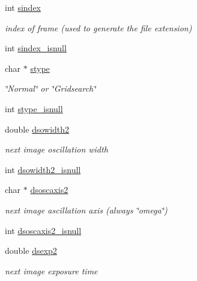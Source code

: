 \begin{DoxyCompactItemize}
\item 
int \hyperlink{structlspg__nextshot__struct_a5d096f2c2bf9be29c44129b54eaf01da}{sindex}
\begin{DoxyCompactList}\small\item\em index of frame (used to generate the file extension) \item\end{DoxyCompactList}\item 
int \hyperlink{structlspg__nextshot__struct_a7ca4fbc86974d1b75a681ba5ecaaf5af}{sindex\_\-isnull}
\item 
char $\ast$ \hyperlink{structlspg__nextshot__struct_ab5a70b189c2fe516ca0c84bd06f3e564}{stype}
\begin{DoxyCompactList}\small\item\em \char`\"{}Normal\char`\"{} or \char`\"{}Gridsearch\char`\"{} \item\end{DoxyCompactList}\item 
int \hyperlink{structlspg__nextshot__struct_a79f48c452a4aca8506bae22f897c7441}{stype\_\-isnull}
\item 
double \hyperlink{structlspg__nextshot__struct_a5378e13735a5392a9fcd853ce8c9e929}{dsowidth2}
\begin{DoxyCompactList}\small\item\em next image oscillation width \item\end{DoxyCompactList}\item 
int \hyperlink{structlspg__nextshot__struct_a5ffd27b8063506fd54162658e5c2ce8a}{dsowidth2\_\-isnull}
\item 
char $\ast$ \hyperlink{structlspg__nextshot__struct_ac86005a6e90ff502da9e95b59d0b7a5f}{dsoscaxis2}
\begin{DoxyCompactList}\small\item\em next image ascillation axis (always \char`\"{}omega\char`\"{}) \item\end{DoxyCompactList}\item 
int \hyperlink{structlspg__nextshot__struct_a98e280e99ae847559bb82836df3c32d1}{dsoscaxis2\_\-isnull}
\item 
double \hyperlink{structlspg__nextshot__struct_a4d8c34309572875352ddabe9cc9001ee}{dsexp2}
\begin{DoxyCompactList}\small\item\em next image exposure time \item\end{DoxyCompactList}\item 

\end{DoxyCompactItemize}
